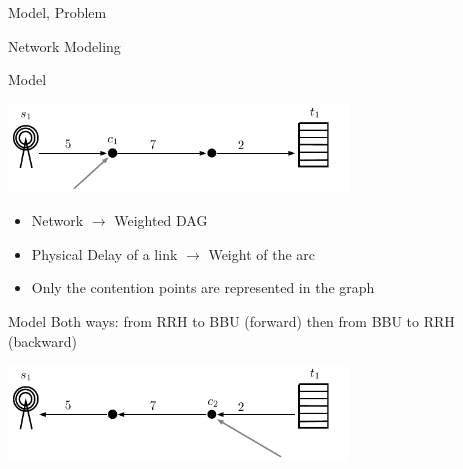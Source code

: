\documentclass[10 pt]{beamer}
\begin{document}
\begin{section}{Model, Problem}

\begin{subsection}{Network Modeling}

\begin{frame}{Model}
\begin{center}
  \includegraphics [width=9cm]{1routealler} 
\end{center}

\begin{itemize}
\item Network $\rightarrow$ Weighted DAG
\item  Physical Delay of a link $\rightarrow$ Weight of the arc
\item  Only the contention points are represented in the graph
\end{itemize}

\begin{center}
  \end{center}


 \end{frame}
 
\begin{frame}{Model}
Both ways: from RRH to BBU (forward) then from BBU to RRH (backward)
 \begin{center}
  \includegraphics [width=9cm]{1routeretour} 
\end{center}



\end{frame}
\end{subsection}
\end{section}
\end{document}

